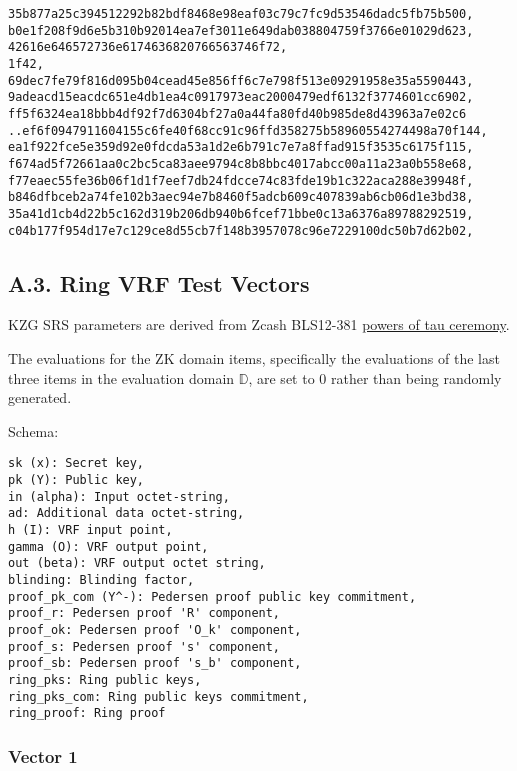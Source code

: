 \documentclass[
]{article}
\begin{document}
\begin{verbatim}
35b877a25c394512292b82bdf8468e98eaf03c79c7fc9d53546dadc5fb75b500,
b0e1f208f9d6e5b310b92014ea7ef3011e649dab038804759f3766e01029d623,
42616e646572736e6174636820766563746f72,
1f42,
69dec7fe79f816d095b04cead45e856ff6c7e798f513e09291958e35a5590443,
9adeacd15eacdc651e4db1ea4c0917973eac2000479edf6132f3774601cc6902,
ff5f6324ea18bbb4df92f7d6304bf27a0a44fa80fd40b985de8d43963a7e02c6
..ef6f0947911604155c6fe40f68cc91c96ffd358275b58960554274498a70f144,
ea1f922fce5e359d92e0fdcda53a1d2e6b791c7e7a8ffad915f3535c6175f115,
f674ad5f72661aa0c2bc5ca83aee9794c8b8bbc4017abcc00a11a23a0b558e68,
f77eaec55fe36b06f1d1f7eef7db24fdcce74c83fde19b1c322aca288e39948f,
b846dfbceb2a74fe102b3aec94e7b8460f5adcb609c407839ab6cb06d1e3bd38,
35a41d1cb4d22b5c162d319b206db940b6fcef71bbe0c13a6376a89788292519,
c04b177f954d17e7c129ce8d55cb7f148b3957078c96e7229100dc50b7d62b02,
\end{verbatim}

\hypertarget{a.3.-ring-vrf-test-vectors}{%
\subsection{A.3. Ring VRF Test
Vectors}\label{a.3.-ring-vrf-test-vectors}}

KZG SRS parameters are derived from Zcash BLS12-381
\href{https://zfnd.org/conclusion-of-the-powers-of-tau-ceremony}{powers
of tau ceremony}.

The evaluations for the ZK domain items, specifically the evaluations of
the last three items in the evaluation domain \(\mathbb{D}\), are set to
0 rather than being randomly generated.

Schema:

\begin{verbatim}
sk (x): Secret key,
pk (Y): Public key,
in (alpha): Input octet-string,
ad: Additional data octet-string,
h (I): VRF input point,
gamma (O): VRF output point,
out (beta): VRF output octet string,
blinding: Blinding factor,
proof_pk_com (Y^-): Pedersen proof public key commitment,
proof_r: Pedersen proof 'R' component,
proof_ok: Pedersen proof 'O_k' component,
proof_s: Pedersen proof 's' component,
proof_sb: Pedersen proof 's_b' component,
ring_pks: Ring public keys,
ring_pks_com: Ring public keys commitment,
ring_proof: Ring proof
\end{verbatim}

\hypertarget{vector-1-2}{%
\subsubsection{Vector 1}\label{vector-1-2}}
\end{document}
